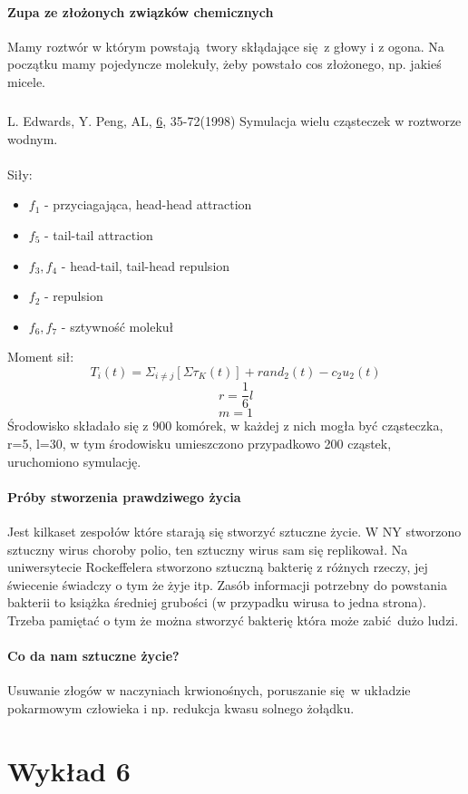 \documentclass{article}
\begin{document}
		\paragraph{Zupa ze złożonych związków chemicznych} Mamy roztwór w którym powstają twory skłądające się z głowy i z ogona. Na początku mamy pojedyncze molekuły, żeby powstało cos złożonego, np. jakieś micele.
		\subparagraph{}L. Edwards, Y. Peng, AL, \underline{6}, 35-72(1998)	Symulacja wielu cząsteczek w roztworze wodnym.
		\paragraph{} Siły: 
		\begin{itemize}
				\item $f_1$ - przyciagająca, head-head attraction 
				\item $f_5$ - tail-tail attraction 
				\item $f_3, f_4$ - head-tail, tail-head repulsion 
				\item $f_2$ - repulsion
				\item $f_6, f_7$ - sztywność molekuł 
		\end{itemize}
		Moment sił:
		$$T_i(t)=\Sigma_{i\neq j}[\Sigma \tau_K(t)]+rand_2(t)-c_2u_2(t)$$
 		$$r=\frac{1}{6}l$$
 		$$m=1$$
		 Środowisko składało się z 900 komórek, w każdej z nich mogła być cząsteczka, r=5, l=30, w tym środowisku umieszczono przypadkowo 200 cząstek, uruchomiono symulację.
		 \paragraph{Próby stworzenia prawdziwego życia} Jest kilkaset zespołów które starają się stworzyć sztuczne życie. W NY stworzono sztuczny wirus choroby polio, ten sztuczny wirus sam się replikował. Na uniwersytecie Rockeffelera stworzono sztuczną bakterię z różnych rzeczy, jej świecenie świadczy o tym że żyje itp. Zasób informacji potrzebny do powstania bakterii to książka średniej grubości (w przypadku wirusa to jedna strona). Trzeba pamiętać o tym że można stworzyć bakterię która może zabić dużo ludzi.
		 \paragraph{Co da nam sztuczne życie?} Usuwanie złogów w naczyniach krwionośnych, poruszanie się w układzie pokarmowym człowieka i np. redukcja kwasu solnego żołądku. 
	\section{Wykład 6}
\end{document}
